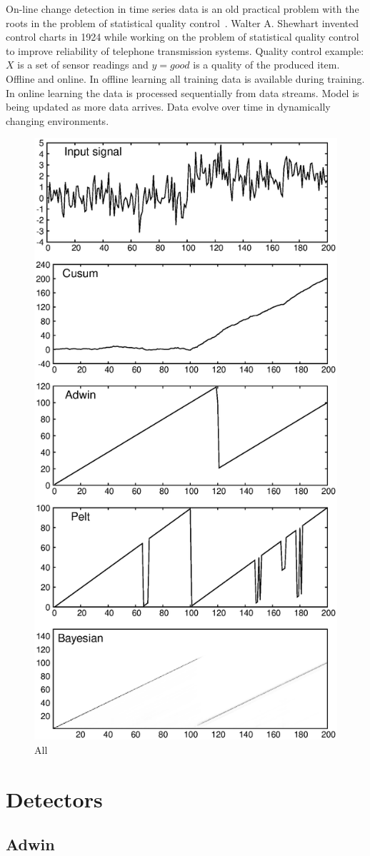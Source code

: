 On-line change detection in time series data is an old practical problem with the roots in the problem of statistical quality control~\cite{basseville1993detection,NISTbook}.
Walter A. Shewhart invented control charts in 1924 while working on the problem of statistical quality control to improve reliability of telephone transmission systems. 
Quality control example: $X$ is a set of sensor readings and $y=good$ is a quality of the produced item. 
Offline and online. 
In offline learning all training data is available during training. 
In online learning the data is processed sequentially from data streams.
Model is being updated as more data arrives. 
Data evolve over time in dynamically changing environments.
\begin{figure}[!htb]
	\centering
	\includegraphics[height=0.9\textwidth]{images/detectors_output_stats}
	\caption{All}\label{fig:all_detectors_stats}
\end{figure}


\section{Detectors}

\subsection{Adwin}

